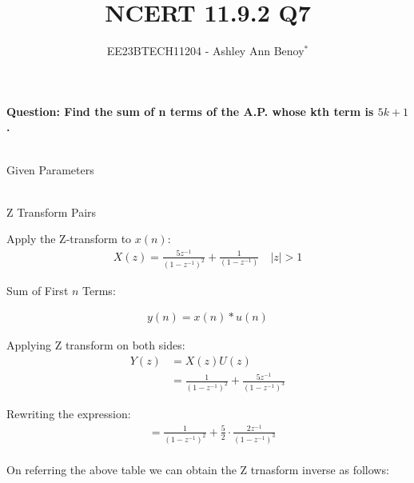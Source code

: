 \documentclass[journal,12pt,twocolumn]{IEEEtran}
\theoremstyle{remark}
\begin{document}

\vspace{3cm}

\title{NCERT 11.9.2  Q7}
\author{EE23BTECH11204 - Ashley Ann Benoy$^{*}$}%
\maketitle
\newpage
\bigskip





\textbf{Question: Find the sum of n terms of the A.P. whose kth term is \(5k + 1\).}\\

\solution
\begin{table}[h!]
	\centering
	\resizebox{6cm}{!}{
		
	}
	\\
	\caption{Given Parameters}
	\label{tab:given_params}  %
\end{table}

\begin{table}[h!]
	\centering
	\resizebox{6cm}{!}{
		
	}
	\\
	\caption{Z Transform Pairs}
	\label{tab:z_transform}  %
\end{table}



Apply the Z-transform to \( x(n) \):
\begin{align}
X(z) = \frac{5z^{-1}}{(1 - z^{-1})^2} + \frac{1}{(1 - z^{-1})}
\quad |z|>1
\end{align}

Sum of First \( n \) Terms:

\begin{align}
y(n) = x(n) * u(n)
\end{align}

Applying Z transform on both sides:
\begin{align}
    Y(z) &= X(z)U(z)\\
    &=\frac{1}{(1-z^{-1})^2} + \frac{5z^{-1}}{(1-z^{-1})^3}
\end{align}




Rewriting the expression:
\begin{align}
&=\frac{1}{(1 - z^{-1})^2} + \frac{5}{2} \cdot \frac{2z^{-1}}{(1 - z^{-1})^3} 
\end{align}
\\
On referring the above table we can obtain the  Z trnasform inverse as follows:
\end{document}
